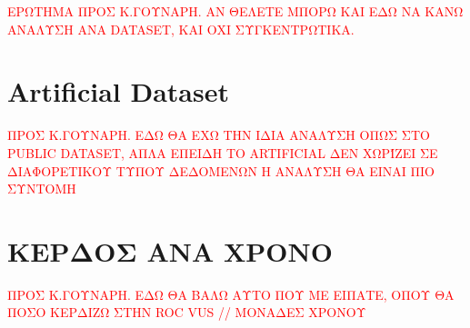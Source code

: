 \textcolor{red}{ΕΡΩΤΗΜΑ ΠΡΟΣ Κ.ΓΟΥΝΑΡΗ. ΑΝ ΘΕΛΕΤΕ ΜΠΟΡΩ ΚΑΙ ΕΔΩ ΝΑ ΚΑΝΩ ΑΝΑΛΥΣΗ ΑΝΑ DATASET, ΚΑΙ ΟΧΙ ΣΥΓΚΕΝΤΡΩΤΙΚΑ.}
\section{Artificial Dataset}
\textcolor{red}{ΠΡΟΣ Κ.ΓΟΥΝΑΡΗ. ΕΔΩ ΘΑ ΕΧΩ ΤΗΝ ΙΔΙΑ ΑΝΑΛΥΣΗ ΟΠΩΣ ΣΤΟ PUBLIC DATASET, ΑΠΛΑ ΕΠΕΙΔΗ ΤO ARTIFICIAL ΔΕΝ ΧΩΡΊΖΕΙ ΣΕ ΔΙΑΦΟΡΕΤΙΚΟΥ ΤΥΠΟΥ ΔΕΔΟΜΕΝΩΝ Η ΑΝΑΛΥΣΗ ΘΑ ΕΙΝΑΙ ΠΙΟ ΣΥΝΤΟΜΗ}
\section{ΚΕΡΔΟΣ ΑΝΑ ΧΡΟΝΟ}
\textcolor{red}{ΠΡΟΣ Κ.ΓΟΥΝΑΡΗ. ΕΔΩ ΘΑ ΒΑΛΩ ΑΥΤΟ ΠΟΥ ΜΕ ΕΙΠΑΤΕ, ΟΠΟΥ ΘΑ ΠΟΣΟ ΚΕΡΔΙΖΩ ΣΤΗΝ ROC VUS // ΜΟΝΑΔΕΣ ΧΡΟΝΟΥ}